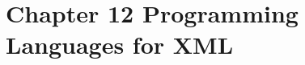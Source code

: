\documentclass[../../main.tex]{subfiles}
\begin{document}
\section{Chapter 12 Programming Languages for XML}




\end{document}
